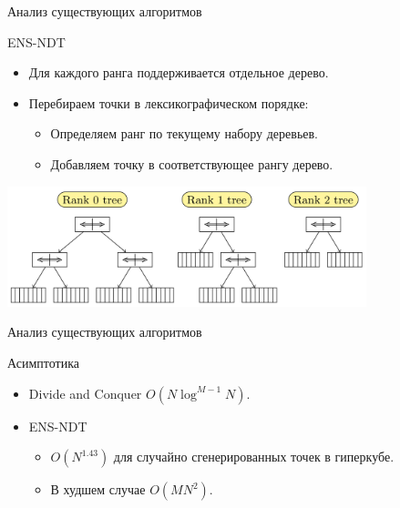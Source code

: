 \documentclass[table]{beamer}
\begin{document}
\begin{frame}{Анализ существующих алгоритмов}
\begin{block}{ENS-NDT}
\begin{itemize}
\item Для каждого ранга поддерживается отдельное дерево.
\item Перебираем точки в лексикографическом порядке:
\begin{itemize}
\item Определяем ранг по текущему набору деревьев. 
\item Добавляем точку в соответствующее рангу дерево. 
\end{itemize}
\end{itemize}
\begin{center}
\includegraphics*[height=3.5cm]{pic/ndtree_original.png}
\end{center}
\end{block}
\end{frame}

\begin{frame}{Анализ существующих алгоритмов}
\begin{block}{Асимптотика}
\begin{itemize}
\item Divide and Conquer $O(N \log^{M-1}N)$.
\item ENS-NDT
\begin{itemize}
\item $O(N^{1.43})$ для случайно сгенерированных точек в гиперкубе.
\item В худшем случае $O(MN^{2})$.
\end{itemize}
\end{itemize}
\end{block}
\end{frame}
\end{document}
